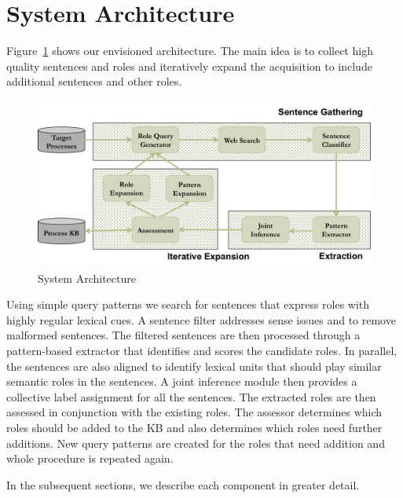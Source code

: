 
\section{System Architecture}

Figure~\ref{fig:architecture} shows our envisioned architecture.
The main idea is to collect high quality sentences and roles and iteratively expand the acquisition to include additional sentences and other roles. 
\begin{figure}[hbt]
	\begin{center}
	\includegraphics[width=5.68in,height=2.21in]{figures/architecture.pdf} 	
	\caption{\label{fig:architecture} {System Architecture}}
	\end{center}
\end{figure}

Using simple query patterns we search for sentences that express roles with highly regular lexical cues. 
A sentence filter addresses sense issues and to remove malformed sentences.
The filtered sentences are then processed through a pattern-based extractor that identifies and scores the candidate roles. 
In parallel, the sentences are also aligned to identify lexical units that should play similar semantic roles in the sentences. 
A joint inference module then provides a collective label assignment for all the sentences. 
The extracted roles are then assessed in conjunction with the existing roles. 
The assessor determines which roles should be added to the KB and also determines which roles need further additions. 
New query patterns are created for the roles that need addition and whole procedure is repeated again. 

In the subsequent sections, we describe each component in greater detail.

